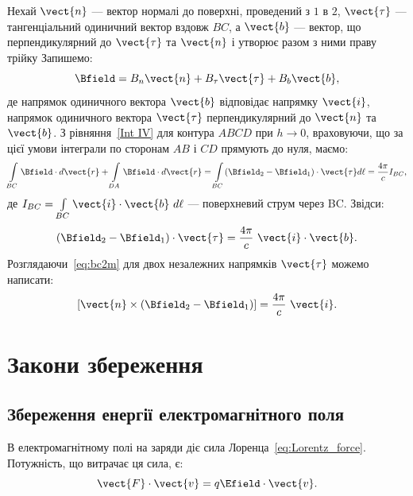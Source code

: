 Нехай $\vect{n}$ --- вектор нормалі до поверхні, проведений з $1$ в $2$,  $\vect{\tau}$ --- тангенціальний одиничний вектор вздовж $BC$, а $\vect{b}$
--- вектор, що перпендикулярний до $\vect{\tau}$ та $\vect{n}$ і утворює разом з ними праву трійку
Запишемо:
\begin{equation*}
	\Bfield = B_n\vect{n} + B_{\tau}\vect{\tau} + B_b\vect{b},
\end{equation*}
де напрямок одиничного вектора $\vect{b}$ відповідає напрямку $\vect{i}$, напрямок
одиничного вектора $\vect{\tau}$ перпендикулярний до $\vect{n}$ та $\vect{b}$.
З рівняння~\eqref {Int IV} для контура $ABCD$ при $h \to 0$, враховуючи, що за цієї
умови інтеграли по сторонам $AB$ і $CD$ прямують до нуля, маємо:
\begin{equation*}
	\int\limits_{BC} \Bfield\cdot d\vect{r} + \int\limits_{DA} \Bfield\cdot d\vect{r} = \int\limits_{BC} (\Bfield_2 - \Bfield_1)\cdot\vect{\tau} d\ell =
	\frac{4\pi}c I_{BC},
\end{equation*}
де $I_{BC} = \int\limits_{BC} \vect{i}\cdot\vect{b}\ d\ell$ --- поверхневий струм через BC. Звідси:
\begin{equation}\label{eq:bc2m}
	(\Bfield_2 - \Bfield_1)\cdot\vect{\tau} = \frac{4\pi}c\ \vect{i}\cdot\vect{b}.
\end{equation}
Розглядаючи~\eqref{eq:bc2m} для двох незалежних напрямків $\vect{\tau}$ можемо написати:
\begin{equation}\label{eq:bc2m2}
	\left[ \vect{n}\times(\Bfield_2 - \Bfield_1)\right]  = \frac{4\pi}c\ \vect{i}.
\end{equation}



\section{Закони збереження}




\subsection*{Збереження енергії електромагнітного поля}


В електромагнітному полі на заряди діє сила Лоренца~\eqref{eq:Lorentz_force}. Потужність,
що витрачає ця сила, є:
\begin{equation*}
	\vect{F}\cdot\vect{v} = q\Efield\cdot\vect{v}.
\end{equation*}

